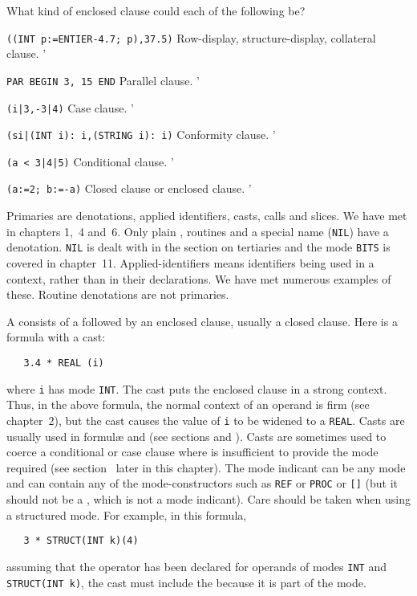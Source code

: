 \begin{exercise}
\item What kind of enclosed clause could each of the following be?
\begin{subex}
\item \verb|((INT p:=ENTIER-4.7; p),37.5)| \subans Row-display,
structure-display, collateral clause.
'
\item \verb|PAR BEGIN 3, 15 END| \subans Parallel clause.
'
\item \verb!(i|3,-3|4)! \subans Case clause.
'
\item \verb!(si|(INT i): i,(STRING i): i)! \subans Conformity clause.
'
\item \verb!(a < 3|4|5)! \subans Conditional clause.
'
\item \verb|(a:=2; b:=-a)| \subans Closed clause or enclosed clause.
'
\end{subex}
\end{exercise}

Primaries are denotations, applied identifiers, casts, calls and
slices. We have met  in chapters 1,~4
and~6. Only plain , routines and a special
name (\verb|NIL|) have a denotation.  \verb|NIL| is dealt with in the
section on tertiaries and the mode \verb|BITS| is covered in
chapter~11.  Applied-identifiers means identifiers being used in a
context, rather than in their declarations.  We have met numerous
examples of these.  Routine denotations are not primaries.

A  consists of a 
followed by an enclosed clause, usually a closed clause. Here is a
formula with a cast:
\begin{verbatim}
   3.4 * REAL (i)
\end{verbatim}
\noindent
where \verb|i| has mode \verb|INT|. The cast puts the enclosed clause
in a strong context. Thus, in the above formula, the normal context
of an operand is firm (see chapter~2), but the cast causes the value
of \verb|i| to be widened to a \verb|REAL|. Casts are usually used in
formul\ae{} and  (see
sections  and ). Casts are
sometimes used to coerce a conditional or case clause where
 is insufficient to provide the mode required (see
section~ later in this chapter). The mode indicant
can be any mode and can contain any of the mode-constructors such as
\verb|REF| or \verb|PROC| or \verb|[]| (but it should not be a
, which is not a mode indicant). Care should be taken
when using a structured mode. For example, in this formula,
\begin{verbatim}
   3 * STRUCT(INT k)(4)
\end{verbatim}
\noindent
assuming that the operator has been declared for operands of modes
\verb|INT| and \verb|STRUCT(INT k)|, the cast must include the
 because it is part of the mode.

